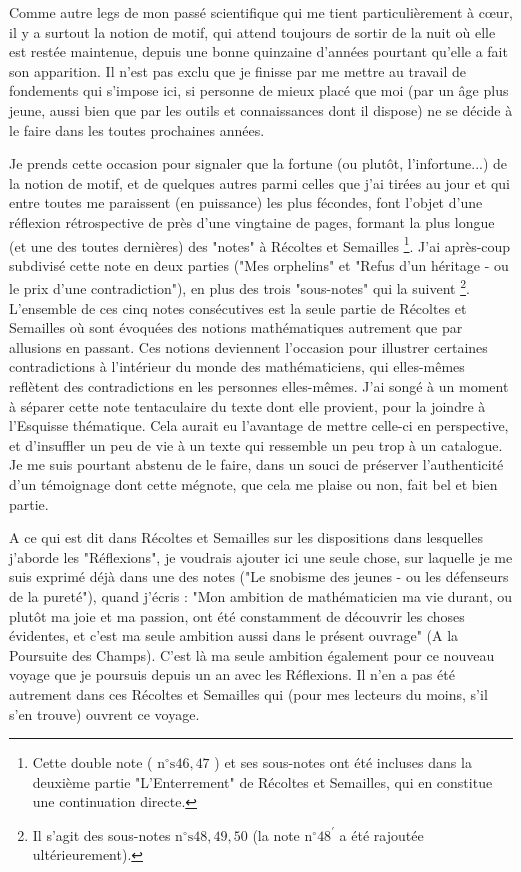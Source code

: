 Comme autre legs de mon passé scientifique qui me tient particulièrement à cœur, il y a surtout la notion de motif, qui attend toujours de sortir de la nuit où elle est restée maintenue, depuis une bonne quinzaine d'années pourtant qu'elle a fait son apparition. Il n'est pas exclu que je finisse par me mettre au travail de fondements qui s'impose ici, si personne de mieux placé que moi (par un âge plus jeune, aussi bien que par les outils et connaissances dont il dispose) ne se décide à le faire dans les toutes prochaines années.

Je prends cette occasion pour signaler que la fortune (ou plutôt, l'infortune...) de la notion de motif, et de quelques autres parmi celles que j'ai tirées au jour et qui entre toutes me paraissent (en puissance) les plus fécondes, font l'objet d'une réflexion rétrospective de près d'une vingtaine de pages, formant la plus longue (et une des toutes dernières) des "notes" à Récoltes et Semailles \footnote{Cette double note ( $\mathrm{n}^{\circ} \mathrm{s} 46,47$ ) et ses sous-notes ont été incluses dans la deuxième partie "L'Enterrement" de Récoltes et Semailles, qui en constitue une continuation directe.}. J'ai après-coup subdivisé cette note en deux parties ("Mes orphelins" et "Refus d'un héritage - ou le prix d'une contradiction"), en plus des trois "sous-notes" qui la suivent \footnote{Il s'agit des sous-notes $\mathrm{n}^{\circ} \mathrm{s} 48,49,50$ (la note $\mathrm{n}^{\circ} 48^{\prime}$ a été rajoutée ultérieurement).}. L'ensemble de ces cinq notes consécutives est la seule partie de Récoltes et Semailles où sont évoquées des notions mathématiques autrement que par allusions en passant. Ces notions deviennent l'occasion pour illustrer certaines contradictions à l'intérieur du monde des mathématiciens, qui elles-mêmes reflètent des contradictions en les personnes elles-mêmes. J'ai songé à un moment à séparer cette note tentaculaire du texte dont elle provient, pour la joindre à l'Esquisse thématique. Cela aurait eu l'avantage de mettre celle-ci en perspective, et d'insuffler un peu de vie à un texte qui ressemble un peu trop à un catalogue. Je me suis pourtant abstenu de le faire, dans un souci de préserver l'authenticité d'un témoignage dont cette mégnote, que cela me plaise ou non, fait bel et bien partie.

A ce qui est dit dans Récoltes et Semailles sur les dispositions dans lesquelles j'aborde les "Réflexions", je voudrais ajouter ici une seule chose, sur laquelle je me suis exprimé déjà dans une des notes ("Le snobisme des jeunes - ou les défenseurs de la pureté"), quand j'écris : "Mon ambition de mathématicien ma vie durant, ou plutôt ma joie et ma passion, ont été constamment de découvrir les choses évidentes, et c'est ma seule ambition aussi dans le présent ouvrage" (A la Poursuite des Champs). C'est là ma seule ambition également pour ce nouveau voyage que je poursuis depuis un an avec les Réflexions. Il n'en a pas été autrement dans ces Récoltes et Semailles qui (pour mes lecteurs du moins, s'il s'en trouve) ouvrent ce voyage.


